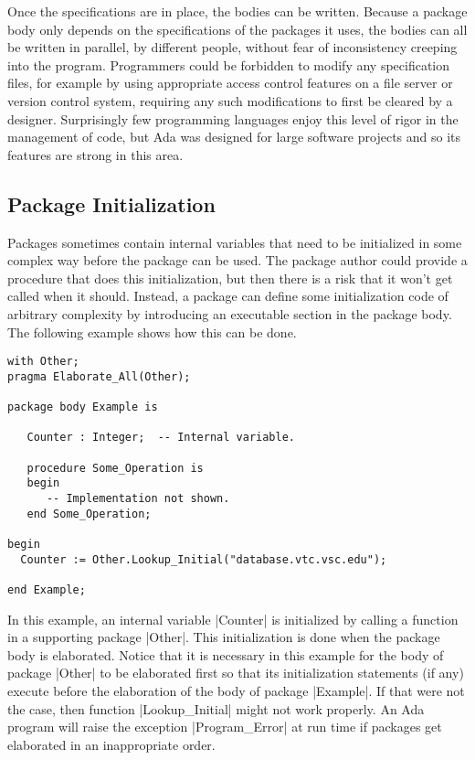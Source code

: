 Once the specifications are in place, the bodies can be written. Because a package body only
depends on the specifications of the packages it uses, the bodies can all be written in
parallel, by different people, without fear of inconsistency creeping into the program.
Programmers could be forbidden to modify any specification files, for example by using
appropriate access control features on a file server or version control system, requiring any
such modifications to first be cleared by a designer. Surprisingly few programming languages
enjoy this level of rigor in the management of code, but Ada was designed for large software
projects and so its features are strong in this area.

\subsection{Package Initialization}

Packages sometimes contain internal variables that need to be initialized in some complex way
before the package can be used. The package author could provide a procedure that does this
initialization, but then there is a risk that it won't get called when it should. Instead, a
package can define some initialization code of arbitrary complexity by introducing an executable
section in the package body. The following example shows how this can be done.

\begin{lstlisting}
with Other;
pragma Elaborate_All(Other);

package body Example is

   Counter : Integer;  -- Internal variable.

   procedure Some_Operation is
   begin
      -- Implementation not shown.
   end Some_Operation;

begin
  Counter := Other.Lookup_Initial("database.vtc.vsc.edu");

end Example;
\end{lstlisting}


In this example, an internal variable |Counter| is initialized by calling a function in a
supporting package |Other|. This initialization is done when the package body is elaborated.
Notice that it is necessary in this example for the body of package |Other| to be elaborated
first so that its initialization statements (if any) execute before the elaboration of the body
of package |Example|. If that were not the case, then function |Lookup_Initial| might not work
properly. An Ada program will raise the exception |Program_Error| at run time if packages get
elaborated in an inappropriate order.

